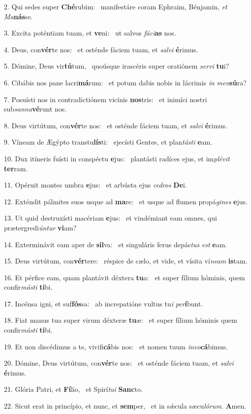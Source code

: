 2. Qui sedes super \textbf{Ché}rubim: \ast\  manifestáre coram Ephraim, Bénjamin, \textit{et} \textit{Ma}\textbf{nás}se.\

3. Excita poténtiam tuam, et \textbf{ve}ni: \ast\  ut salvos \textit{fá}\textit{ci}\textbf{as} nos.\

4. Deus, con\textbf{vér}te nos: \ast\  et osténde fáciem tuam, et \textit{sal}\textit{vi} \textbf{é}rimus.\

5. Dómine, Deus vir\textbf{tú}tum, \ast\  quoúsque irascéris super oratiónem \textit{ser}\textit{vi} \textbf{tu}i?\

6. Cibábis nos pane lacri\textbf{má}rum: \ast\  et potum dabis nobis in lácrimis \textit{in} \textit{men}\textbf{sú}ra?\

7. Posuísti nos in contradictiónem vicínis \textbf{nos}tris: \ast\  et inimíci nostri sub\textit{san}\textit{na}\textbf{vé}runt nos.\

8. Deus virtútum, con\textbf{vér}te nos: \ast\  et osténde fáciem tuam, et \textit{sal}\textit{vi} \textbf{é}rimus.\

9. Víneam de Ægýpto transtu\textbf{lís}ti: \ast\  ejecísti Gentes, et plan\textit{tás}\textit{ti} \textbf{e}am.\

10. Dux itíneris fuísti in conspéctu \textbf{e}jus: \ast\  plantásti radíces ejus, et im\textit{plé}\textit{vit} \textbf{ter}ram.\

11. Opéruit montes umbra \textbf{e}jus: \ast\  et arbústa ejus \textit{ce}\textit{dros} \textbf{De}i.\

12. Exténdit pálmites suos usque ad \textbf{ma}re: \ast\  et usque ad flumen propá\textit{gi}\textit{nes} \textbf{e}jus.\

13. Ut quid destruxísti macériam \textbf{e}jus: \ast\  et vindémiant eam omnes, qui prætergredi\textit{ún}\textit{tur} \textbf{vi}am?\

14. Exterminávit eam aper de \textbf{sil}va: \ast\  et singuláris ferus depás\textit{tus} \textit{est} \textbf{e}am.\

15. Deus virtútum, con\textbf{vér}tere: \ast\  réspice de cælo, et vide, et vísita ví\textit{ne}\textit{am} \textbf{is}tam.\

16. Et pérfice eam, quam plantávit déxtera \textbf{tu}a: \ast\  et super fílium hóminis, quem confir\textit{más}\textit{ti} \textbf{ti}bi.\

17. Incénsa igni, et suf\textbf{fós}sa: \ast\  ab increpatióne vultus tu\textit{i} \textit{per}\textbf{í}bunt.\

18. Fiat manus tua super virum déxteræ \textbf{tu}æ: \ast\  et super fílium hóminis quem confir\textit{más}\textit{ti} \textbf{ti}bi.\

19. Et non discédimus a te, vivifi\textbf{cá}bis nos: \ast\  et nomen tuum \textit{in}\textit{vo}\textbf{cá}bimus.\

20. Dómine, Deus virtútum, con\textbf{vér}te nos: \ast\  et osténde fáciem tuam, et \textit{sal}\textit{vi} \textbf{é}rimus.\

21. Glória Patri, et \textbf{Fí}lio, \ast\  et Spirí\textit{tu}\textit{i} \textbf{Sanc}to.\

22. Sicut erat in princípio, et nunc, et \textbf{sem}per, \ast\  et in sǽcula sæcu\textit{ló}\textit{rum}. \textbf{A}men.\

